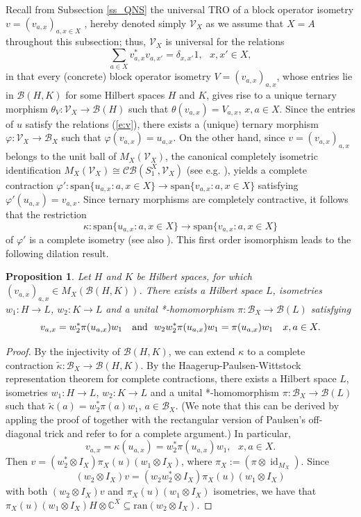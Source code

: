 \documentclass[11pt]{amsart}
\newtheorem{proposition}[theorem]{Proposition}
\theoremstyle{definition}
\DeclareMathOperator{\id}{id}
\newcommand{\cl}[1]{\mathcal{#1}}
\newcommand{\ten}{\otimes}
\newcommand{\vphi}{\varphi}
\newcommand{\C}{\mathbb{C}}
\begin{document}
Recall from Subsection \ref{ss_QNS} the universal TRO of a block operator isometry $v=(v_{a,x})_{a,x\in X}$ \cite{tt-QNS}, hereby denoted simply $\cl V_X$ as we assume 
that $X = A$ throughout this subsection; thus, $\cl V_X$ is universal for the relations
\begin{equation}\label{e:v}\sum_{a\in X}v_{a,x}^*v_{a,x'}=\delta_{x,x'}1, \ \ \ x,x'\in X,\end{equation}
in that every (concrete) block operator isometry $V = (v_{a,x})_{a,x}$, 
whose entries lie in $\cl B(H,K)$ for some Hilbert spaces $H$ and $K$,
gives rise to a unique 
ternary morphism $\theta_V : \cl V_X\to \cl B(H)$ such that $\theta(v_{a,x}) = V_{a,x}$, $x,a\in X$. 
Since the entries of $u$ satisfy the relations (\ref{e:v}), there 
exists a (unique) ternary morphism $\vphi:\cl{V}_X\to\cl{B}_X$ such that $\vphi(v_{a,x})=u_{a,x}$. On the other hand, since $v=(v_{a,x})_{a,x}$ belongs to the unit ball of 
$M_X(\cl V_X)$, the canonical completely isometric identification $M_X(\cl V_X)\cong \cl{CB}(S_1^X,\cl V_X)$
(see e.g.  \cite[Proposition 1.5.14]{BLM}),
yields a complete contraction $\vphi':\mathrm{span}\{u_{a,x}:a,x\in X\}\to\mathrm{span}\{v_{a,x}:a,x\in X\}$ satisfying $\vphi'(u_{a,x})=v_{a,x}$. Since ternary morphisms are completely contractive, it follows that the restriction
$$\kappa : \mathrm{span}\{u_{a,x}:a,x\in X\}\to \mathrm{span}\{v_{a,x}:a,x\in X\}$$
of $\vphi'$ is a complete isometry (see also \cite[Proposition 4.1]{cltt}). This first order isomorphism leads to the following dilation result.

\begin{proposition}\label{p:dilate} 
Let $H$ and $K$ be Hilbert spaces, for which
$(v_{a,x})_{a,x}\in M_X(\cl{B}(H,K))$. 
There exists a Hilbert space $L$, isometries $w_1:H\to L$, $w_2:K\to L$ and a unital *-homomorphism $\pi:\cl{B}_X\to\cl{B}(L)$ satisfying $$v_{a,x}=w_2^*\pi(u_{a,x})w_1 \ \ \ \textnormal{and}  \ \ w_2w_2^*\pi(u_{a,x})w_1=\pi(u_{a,x})w_1 \ \ \ x,a\in X.$$
\end{proposition}

\begin{proof} 
By the injectivity of $\cl{B}(H,K)$, we can extend $\kappa$ to a complete contraction $\widetilde{\kappa}:\cl{B}_X\rightarrow\cl{B}(H,K)$. By the 
Haagerup-Paulsen-Wittstock representation theorem for complete contractions, there exists a Hilbert space $L$, isometries $w_1:H\to L$, $w_2:K\to L$ and a unital *-homomorphism $\pi:\cl{B}_X\to\cl{B}(L)$ such that $\widetilde{\kappa}(a)=w_2^*\pi(a)w_1$, $a\in \cl{B}_X$. (We note that this 
can be derived by appling the proof of \cite[Theorem B.7]{BO} together with the rectangular version of Paulsen's off-diagonal trick \cite[Lemma 1.3.15]{BLM}
and refer to \cite[Theorem 2.1.12]{ekt} for a complete argument.) 
In particular, 
$$v_{a,x}=\kappa(u_{a,x})=w_2^*\pi(u_{a,x})w_1, \ \ \ x,a\in X.$$
Then $v=(w_2^*\ten I_X)\pi_X(u)(w_1\ten I_X)$, where $\pi_X:=(\pi\ten\id_{M_X})$. Since $$(w_2\ten I_X)v=(w_2w_2^*\ten I_X)\pi_X(u)(w_1\ten I_X)$$ 
with both $(w_2\ten I_X)v$ and $\pi_X(u)(w_1\ten I_X)$ isometries, we have that 
$\pi_X(u)(w_1\ten I_X)H\ten\C^X\subseteq\mathrm{ran}(w_2\ten I_X)$.
\end{proof}
\end{document}
